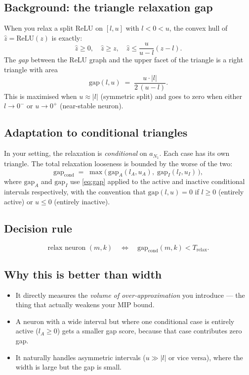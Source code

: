 \documentclass[11pt,a4paper]{article}
\newcommand{\Trelax}{T_{\mathrm{relax}}}
\newcommand{\ReLU}{\mathrm{ReLU}}
\newcommand{\gap}{\mathrm{gap}}
\begin{document}
\subsection{Background: the triangle relaxation gap}

When you relax a split ReLU on $[l,u]$ with $l<0<u$, the convex hull of
$\hat z = \ReLU(z)$ is exactly:
\[
  \hat z \ge 0, \quad \hat z \ge z, \quad
  \hat z \le \frac{u}{u-l}(z - l).
\]
The \emph{gap} between the ReLU graph and the upper facet of the triangle is
a right triangle with area
\begin{equation}\label{eq:gap}
  \gap(l,u) \;=\; \frac{u \cdot |l|}{2\,(u - l)}.
\end{equation}
This is maximised when $u \approx |l|$ (symmetric split) and goes to zero when
either $l \to 0^{-}$ or $u \to 0^{+}$ (near-stable neuron).

\subsection{Adaptation to conditional triangles}

In your setting, the relaxation is \emph{conditional} on $a_{N_1}$.
Each case has its own triangle.  The total relaxation looseness is bounded by
the worse of the two:
\begin{equation}\label{eq:condgap}
  \gap_{\mathrm{cond}} \;=\;
  \max\!\Big(\,
    \gap_A(l_A, u_A),\;
    \gap_I(l_I, u_I)
  \,\Big),
\end{equation}
where $\gap_A$ and $\gap_I$ use \cref{eq:gap} applied to the active and
inactive conditional intervals respectively, with the convention that
$\gap(l,u) = 0$ if $l \ge 0$ (entirely active) or $u \le 0$ (entirely
inactive).

\subsection{Decision rule}
\begin{equation}
  \text{relax neuron $(m,k)$}
  \quad\Longleftrightarrow\quad
  \gap_{\mathrm{cond}}(m,k) < \Trelax.
\end{equation}

\subsection{Why this is better than width}
\begin{itemize}
  \item It directly measures the \emph{volume of over-approximation} you
        introduce --- the thing that actually weakens your MIP bound.
  \item A neuron with a wide interval but where one conditional case is entirely
        active ($l_A \ge 0$) gets a smaller gap score, because that case
        contributes zero gap.
  \item It naturally handles asymmetric intervals ($u \gg |l|$ or vice versa),
        where the width is large but the gap is small.
\end{itemize}
\end{document}
